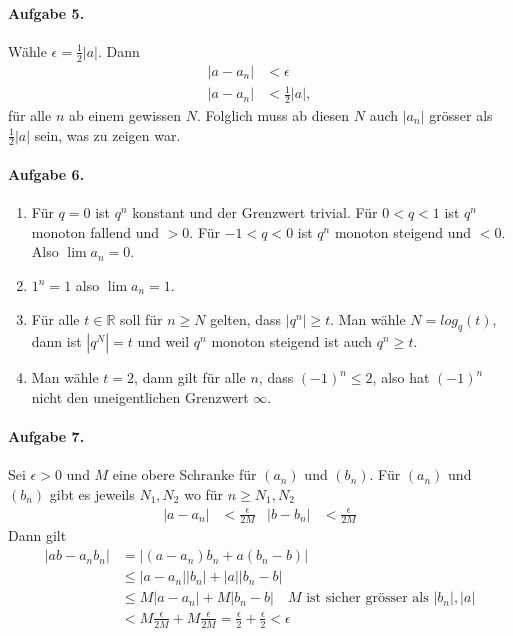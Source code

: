 \documentclass{article}
\begin{document}
\paragraph{Aufgabe 5.} W\"ahle $\epsilon = \frac{1}{2}|a|$. Dann
\begin{align*}
    |a - a_n| &< \epsilon \\
    |a - a_n| &< \frac{1}{2}|a|,
\end{align*}
f\"ur alle $n$ ab einem gewissen $N$. Folglich muss ab diesen $N$ auch $|a_n|$ gr\"osser als $\frac{1}{2}|a|$ sein, was zu zeigen war. 

\paragraph{Aufgabe 6.}
\begin{enumerate}
    \item Für $q = 0$ ist $q^n$ konstant und der Grenzwert trivial. Für $0 < q < 1$ ist $q^n$ monoton fallend und $> 0$. Für $-1 < q < 0$ ist $q^n$ monoton steigend und $< 0$. Also $\lim a_n = 0$.
    
    \item $1^n = 1$ also $\lim a_n = 1$.
    
    \item Für alle $t \in \mathbb{R}$ soll für $n \geq N$ gelten, dass $|q^n| \geq t$. Man wähle $N = log_q(t)$, dann ist $|q^N| = t$ und weil $q^n$ monoton steigend ist auch $q^n \geq t$.
    
    \item Man wähle $t = 2$, dann gilt für alle $n$, dass $(-1)^n \leq 2$, also hat $(-1)^n$ nicht den uneigentlichen Grenzwert $\infty$.
\end{enumerate}

\paragraph{Aufgabe 7.} Sei $\epsilon > 0$ und $M$ eine obere Schranke für $(a_n)$ und $(b_n)$. Für $(a_n)$ und $(b_n)$ gibt es jeweils $N_1, N_2$ wo für $n \geq N_1, N_2$
\begin{align*}
    |a - a_n| &< \frac{\epsilon}{2M} & |b - b_n| &< \frac{\epsilon}{2M}
\end{align*}
Dann gilt
\begin{align*}
    |ab - a_nb_n| &= |(a - a_n)b_n + a(b_n - b)| \\
    &\leq |a - a_n||b_n| + |a||b_n - b| \\
    &\leq M|a - a_n| + M|b_n - b| \quad \text{$M$ ist sicher grösser als $|b_n|, |a|$} \\
    &< M\frac{\epsilon}{2M} + M\frac{\epsilon}{2M} = \frac{\epsilon}{2} + \frac{\epsilon}{2} < \epsilon
\end{align*}
\end{document}
